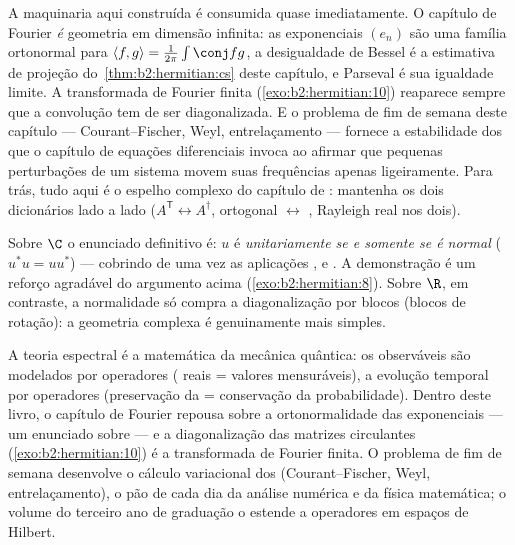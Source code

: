 \begin{remark}
A maquinaria  aqui construída é consumida quase
imediatamente. O capítulo de Fourier \emph{é} geometria 
em dimensão infinita: as exponenciais $(e_n)$ são uma
família ortonormal para $\langle f, g\rangle =
\frac{1}{2\pi}\int\conj fg$, a desigualdade de Bessel é a
estimativa de projeção do~\cref{thm:b2:hermitian:cs} deste capítulo,
e Parseval é sua igualdade limite. A transformada de Fourier finita
(\cref{exo:b2:hermitian:10}) reaparece sempre que a convolução
tem de ser diagonalizada. E o problema de fim de semana deste capítulo ---
Courant--Fischer, Weyl, entrelaçamento --- fornece a
estabilidade dos  que o capítulo de equações diferenciais
invoca ao afirmar que pequenas perturbações de um sistema
movem suas frequências apenas ligeiramente. Para trás, tudo aqui
é o espelho complexo do capítulo de : mantenha os
dois dicionários lado a lado ($A^{\mathsf T} \leftrightarrow
A^\dagger$, ortogonal $\leftrightarrow$ , Rayleigh
real nos dois).
\end{remark}

\begin{remark}
Sobre $\C$ o enunciado definitivo é: $u$ é \emph{unitariamente
 se e somente se é normal} ($u^*u = uu^*$) ---
cobrindo de uma vez as aplicações ,  e . A
demonstração é um reforço agradável do argumento acima
(\cref{exo:b2:hermitian:8}). Sobre $\R$, em contraste, a normalidade só
compra a diagonalização por blocos (blocos de rotação): a geometria complexa é
genuinamente mais simples.
\end{remark}

\begin{remark}
A teoria espectral  é a matemática da mecânica
quântica: os observáveis são modelados por operadores 
( reais = valores mensuráveis), a evolução temporal por operadores 
(preservação da  = conservação da probabilidade). Dentro
deste livro, o capítulo de Fourier repousa sobre a ortonormalidade das
exponenciais --- um enunciado sobre  --- e
a diagonalização das matrizes circulantes
(\cref{exo:b2:hermitian:10}) é a transformada de Fourier finita.
O problema de fim de semana desenvolve o cálculo variacional dos
 (Courant--Fischer, Weyl, entrelaçamento), o pão de cada
dia da análise numérica e da física matemática; o volume do terceiro
ano de graduação o estende a operadores   em
espaços de Hilbert.
\end{remark}

